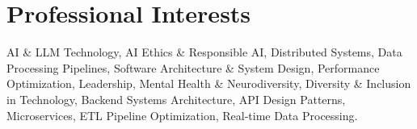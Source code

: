 
\section{Professional Interests}
\footnotesize{AI \& LLM Technology, AI Ethics \& Responsible AI, Distributed Systems, Data Processing Pipelines, Software Architecture \& System Design, Performance Optimization, Leadership, Mental Health \& Neurodiversity, Diversity \& Inclusion in Technology, Backend Systems Architecture, API Design Patterns, Microservices, ETL Pipeline Optimization, Real-time Data Processing.}